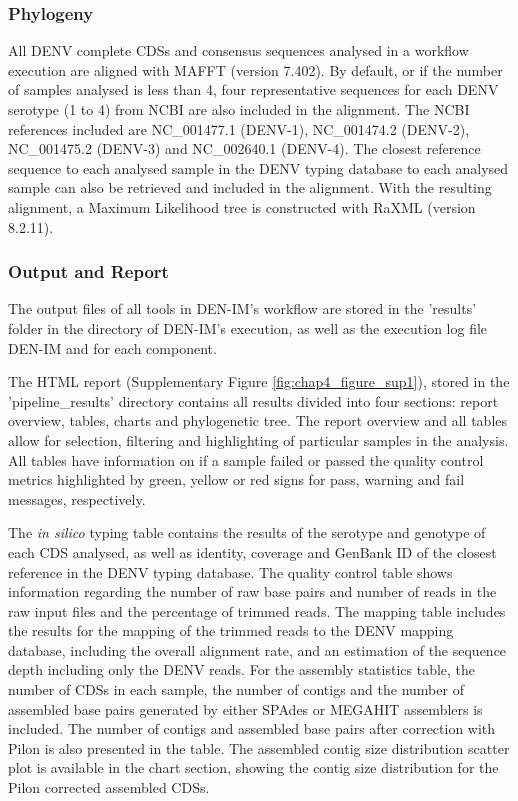 \subsubsection{Phylogeny}

All DENV complete CDSs and consensus sequences analysed in a workflow execution are aligned with MAFFT \citep{nakamura_parallelization_2018} (version 7.402). By default, or if the number of samples analysed is less than 4, four representative sequences for each DENV serotype (1 to 4) from NCBI are also included in the alignment. The NCBI references included are NC\_001477.1 (DENV-1), NC\_001474.2 (DENV-2), NC\_001475.2 (DENV-3) and NC\_002640.1 (DENV-4). The closest reference sequence to each analysed sample in the DENV typing database to each analysed sample can also be retrieved and included in the alignment. With the resulting alignment, a Maximum Likelihood tree is constructed with RaXML \citep{stamatakis_raxml_2014} (version 8.2.11). 

\subsubsection{Output and Report}

The output files of all tools in DEN-IM’s workflow are stored in the ’results’ folder in the directory of DEN-IM’s execution, as well as the execution log file DEN-IM and for each component. 

The HTML report (Supplementary Figure \ref{fig:chap4_figure_sup1}), stored in the ’pipeline\_results’ directory contains all results divided into four sections: report overview, tables, charts and phylogenetic tree. The report overview and all tables allow for selection, filtering and highlighting of particular samples in the analysis. All tables have information on if a sample failed or passed the quality control metrics highlighted by green, yellow or red signs for pass, warning and fail messages, respectively. 

The \textit{in silico} typing table contains the results of the serotype and genotype of each CDS analysed, as well as identity, coverage and GenBank ID of the closest reference in the DENV typing database. The quality control table shows information regarding the number of raw base pairs and number of reads in the raw input files and the percentage of trimmed reads. The mapping table includes the results for the mapping of the trimmed reads to the DENV mapping database, including the overall alignment rate, and an estimation of the sequence depth including only the DENV reads. For the assembly statistics table, the number of CDSs in each sample, the number of contigs and the number of assembled base pairs generated by either SPAdes or MEGAHIT assemblers is included. The number of contigs and assembled base pairs after correction with Pilon is also presented in the table. The assembled contig size distribution scatter plot is available in the chart section, showing the contig size distribution for the Pilon corrected assembled CDSs.

